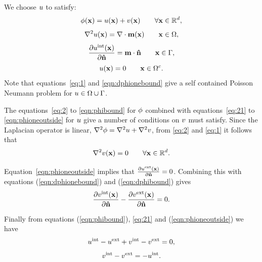 We choose $u$ to satisfy:
\begin{equation}
  \phi(\mathbf{x}) = u(\mathbf{x}) + v(\mathbf{x}) \qquad \forall \mathbf{x} \in {\mathbb{R}^d},
  \label{eq:21}
\end{equation}
\begin{equation}
  \nabla^2 u(\mathbf{x}) = \nabla \cdot \mathbf{m}(\mathbf{x}) \qquad \mathbf{x} \in \Omega,
  \label{eq:1}
\end{equation}
\begin{equation}
  \frac{\partial u^{\text{int}}(\mathbf{x})}{\partial \mathbf{\hat{n}}} = \mathbf{m} \cdot \mathbf{\hat{n}} \qquad \mathbf{x} \in {\Gamma},
  \label{eqn:dphionebound}
\end{equation}
\begin{equation}
  u(\mathbf{x}) = 0 \qquad \mathbf{x} \in {\Omega^c}.
  \label{eqn:phioneoutside}
\end{equation}
Note that equations~\eqref{eq:1} and \eqref{eqn:dphionebound} give a self contained Poisson Neumann problem for $u \in \Omega \cup {\Gamma}$.

The equations~\eqref{eq:2} to \eqref{eqn:phibound} for $\phi$ combined with equations~\eqref{eq:21} to \eqref{eqn:phioneoutside} for $u$ give a number of conditions on $v$ must satisfy. Since the Laplacian operator is linear, \ie $\nabla^2 \phi = \nabla^2 u + \nabla^2 v$, from \eqref{eq:2} and \eqref{eq:1} it follows that
\begin{equation}
  \label{eq:8}
  \nabla^2 v(\mathbf{x}) = 0 \qquad \forall \mathbf{x} \in {\mathbb{R}^d}.
\end{equation}

Equation~\eqref{eqn:phioneoutside} implies that $\frac{\partial u^{\text{ext}}(\mathbf{x})}{\partial \mathbf{\hat{n}}} = 0$. Combining this with equations (\ref{eqn:dphionebound}) and (\ref{eqn:dphibound}) gives
\begin{equation}
  \label{eq:5}
  \frac{\partial v^{\text{int}}(\mathbf{x})}{\partial \mathbf{\hat{n}}} - \frac{\partial v^{\text{ext}}(\mathbf{x})}{\partial \mathbf{\hat{n}}} = 0.
\end{equation}

Finally from equations (\ref{eqn:phibound}), \eqref{eq:21} and (\ref{eqn:phioneoutside}) we have
\begin{equation*}
  u^{\text{int}} - u^{\text{ext}} + v^{\text{int}} - v^{\text{ext}} = 0,
\end{equation*}
\begin{equation}
  v^{\text{int}} - v^{\text{ext}} = - u^{\text{int}}.
\label{eq:4}
\end{equation}

